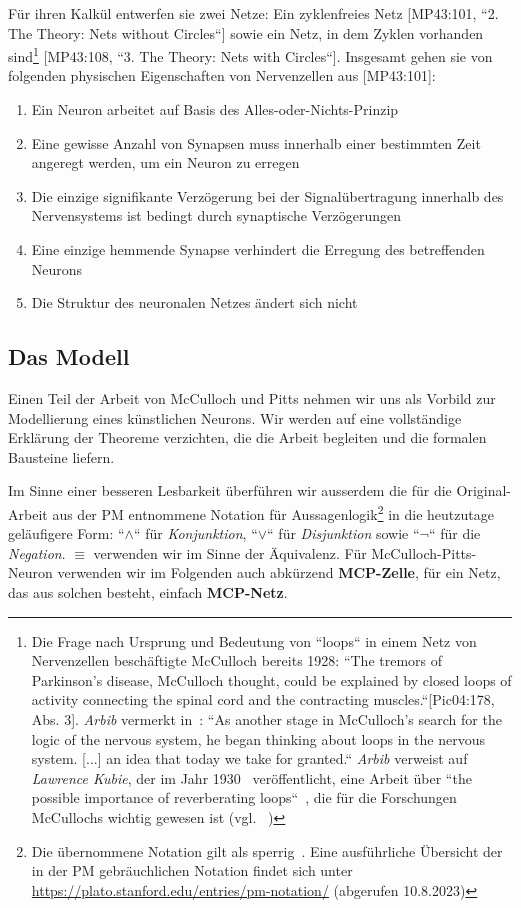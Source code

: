 Für ihren Kalkül entwerfen sie zwei Netze: Ein zyklenfreies Netz [MP43:101, ``2. The Theory: Nets without Circles``] sowie ein Netz, in dem Zyklen vorhanden sind\footnote{
    Die Frage nach Ursprung und Bedeutung von ``loops`` in einem Netz von Nervenzellen beschäftigte McCulloch bereits 1928: ``The tremors of Parkinson’s disease, McCulloch thought, could be explained by closed loops of activity connecting the spinal cord and the contracting muscles.``[Pic04:178, Abs. 3]. \textit{Arbib} vermerkt in~\cite[3]{Arb19}: ``As another stage in McCulloch's search for the logic of the nervous system, he began thinking about loops in the nervous system. [...] an idea that today we take for granted.`` \textit{Arbib} verweist auf \textit{Lawrence Kubie}, der im Jahr 1930~\cite{Kub30} veröffentlicht, eine Arbeit über ``the possible importance of reverberating loops``~\cite[5]{Arb19}, die für die Forschungen McCullochs wichtig gewesen ist (vgl. ~\cite[5]{Arb19})
} [MP43:108, ``3. The Theory: Nets with Circles``]. Insgesamt gehen sie von folgenden physischen Eigenschaften von Nervenzellen aus [MP43:101]:


\begin{enumerate}
    \item Ein Neuron arbeitet auf Basis des Alles-oder-Nichts-Prinzip
    \item Eine gewisse Anzahl von Synapsen muss innerhalb einer bestimmten Zeit angeregt werden, um ein Neuron zu erregen
    \item Die einzige signifikante Verzögerung bei der Signalübertragung innerhalb des Nervensystems ist bedingt durch synaptische Verzögerungen
    \item Eine einzige hemmende Synapse verhindert die Erregung des betreffenden Neurons
    \item Die Struktur des neuronalen Netzes ändert sich nicht
\end{enumerate}


\subsection{Das Modell}

Einen Teil der Arbeit von McCulloch und Pitts nehmen wir uns als Vorbild zur Modellierung eines künstlichen Neurons.
Wir werden auf eine vollständige Erklärung der Theoreme verzichten, die die Arbeit begleiten und die formalen Bausteine liefern.

Im Sinne einer besseren Lesbarkeit überführen wir ausserdem die für die Original-Arbeit aus der PM entnommene Notation für Aussagenlogik\footnote{
    Die übernommene Notation gilt als sperrig~\cite[16]{AR88}. Eine ausführliche Übersicht der in der PM gebräuchlichen Notation findet sich unter \url{https://plato.stanford.edu/entries/pm-notation/} (abgerufen 10.8.2023)
} in die heutzutage geläufigere Form: ``$\land$`` für \textit{Konjunktion}, ``$\lor$`` für \textit{Disjunktion} sowie ``$\neg$`` für die \textit{Negation}. $\equiv$ verwenden wir im Sinne der Äquivalenz.
Für McCulloch-Pitts-Neuron verwenden wir im Folgenden auch abkürzend \textbf{MCP-Zelle}, für ein Netz, das aus solchen besteht, einfach \textbf{MCP-Netz}.\\



